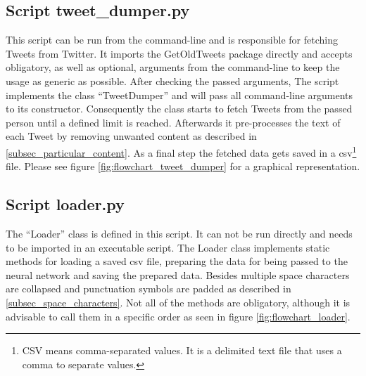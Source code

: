 \documentclass[conference]{IEEEtran}
\begin{document}
\subsection{Script tweet\_dumper.py}

This script can be run from the command-line and is responsible for fetching Tweets from Twitter. It imports the GetOldTweets package directly and accepts obligatory, as well as optional, arguments from the command-line to keep the usage as generic as possible. After checking the passed arguments, The script implements the class ``TweetDumper'' and will pass all command-line arguments to its constructor. Consequently the class starts to fetch Tweets from the passed person until a defined limit is reached. Afterwards it pre-processes the text of each Tweet by removing unwanted content as described in \ref{subsec_particular_content}. As a final step the fetched data gets saved in a csv\footnote{CSV means comma-separated values. It is a delimited text file that uses a comma to separate values.} file. Please see figure \ref{fig:flowchart_tweet_dumper} for a graphical representation.


\subsection{Script loader.py}\label{subsec_loader}

The ``Loader'' class is defined in this script. It can not be run directly and needs to be imported in an executable script. The Loader class implements static methods for loading a saved csv file, preparing the data for being passed to the neural network and saving the prepared data. Besides multiple space characters are collapsed and punctuation symbols are padded as described in \ref{subsec_space_characters}. Not all of the methods are obligatory, although it is advisable to call them in a specific order as seen in figure \ref{fig:flowchart_loader}. 

\end{document}
